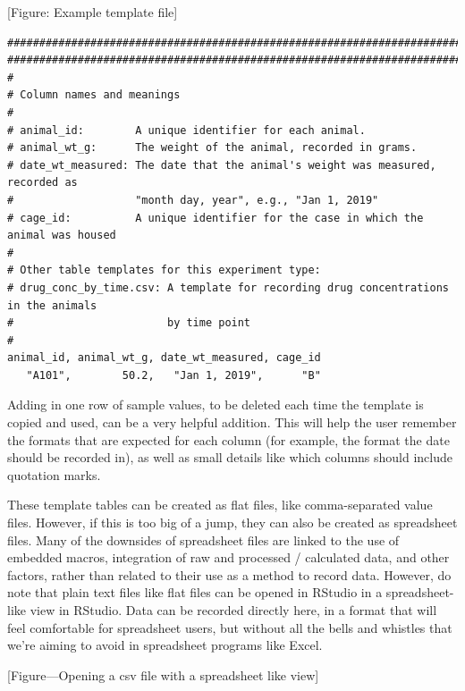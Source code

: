 \documentclass[]{tufte-book}
\begin{document}
{[}Figure: Example template file{]}

\begin{verbatim}
####################################################################################
####################################################################################
#
# Column names and meanings
#
# animal_id:        A unique identifier for each animal. 
# animal_wt_g:      The weight of the animal, recorded in grams. 
# date_wt_measured: The date that the animal's weight was measured, recorded as 
#                   "month day, year", e.g., "Jan 1, 2019"
# cage_id:          A unique identifier for the case in which the animal was housed
# 
# Other table templates for this experiment type: 
# drug_conc_by_time.csv: A template for recording drug concentrations in the animals
#                        by time point
# 
animal_id, animal_wt_g, date_wt_measured, cage_id
   "A101",        50.2,   "Jan 1, 2019",      "B"    
\end{verbatim}

Adding in one row of sample values, to be deleted each time the template is
copied and used, can be a very helpful addition. This will help the user remember
the formats that are expected for each column (for example, the format the
date should be recorded in), as well as small details like which columns should
include quotation marks.

These template tables can be created as flat files, like comma-separated value
files. However, if this is too big of a jump, they can also be created as
spreadsheet files. Many of the downsides of spreadsheet files are linked to
the use of embedded macros, integration of raw and processed / calculated data,
and other factors, rather than related to their use as a method to record data.
However, do note that plain text files like flat files can be opened in RStudio
in a spreadsheet-like view in RStudio. Data can be recorded directly here, in
a format that will feel comfortable for spreadsheet users, but without all the
bells and whistles that we're aiming to avoid in spreadsheet programs like Excel.

{[}Figure---Opening a csv file with a spreadsheet like view{]}
\end{document}
